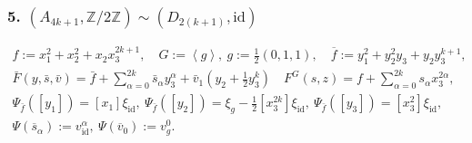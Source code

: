 \documentclass[reqno,12pt]{amsart}
\numberwithin{equation}{section}
\theoremstyle{plain}
\theoremstyle{definition}
\newcommand{\ZZ}{{\mathbb{Z}}}
\newcommand{\id}{\mathrm{id}}
\numberwithin{equation}{section}
\begin{document}
\subsubsection*{\textbf{5.} $(A_{4k+1}, \ZZ/2\ZZ) \sim (D_{2(k+1)}, \id)$ }
\begin{gather*}
f:=x_1^{2}+x_2^2+x_2x_3^{2k+1},\quad G:=\left<g\right>,\ g:=\frac{1}{2}(0,1,1), \quad \overline{f}:=y_1^2+y_2^2y_3+y_2y_3^{k+1},
\\
\bar{F} (y, \bar{s}, \bar{v}) = \bar{f} + \sum_{\alpha = 0}^{2k} \bar{s}_\alpha y_3^\alpha + \bar{v}_1(y_2 + \frac{1}{2}y_3^k) \quad F^G(s,z) = f + \sum_{\alpha = 0}^{2k} s_\alpha x_3^{2\alpha},
\\
\Psi_{\bar{f}}([y_1]) = [x_1]\xi_{\id}, \ \Psi_{\bar{f}}([y_2]) = \xi_{g}- \frac{1}{2}[x_3^{2k}]\xi_{\id}, \ \Psi_{\bar{f}}([y_3]) = [x_3^2]\xi_{\id}, 
\\
\Psi (\overline s_\alpha) := v_\id^{\alpha}, \ \Psi (\overline v_0) := v_g^{0}.
\end{gather*}
\end{document}
